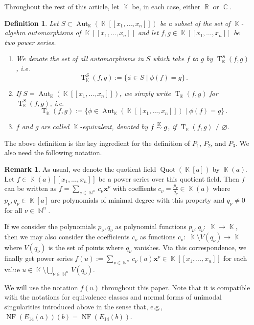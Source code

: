 \documentclass[noend]{amsproc}
\newtheorem{defn}[theorem]{Definition}
\theoremstyle{definition}
\newtheorem{remark}[theorem]{Remark}
\DeclareMathOperator{\N}{\mathbb{N}}
\DeclareMathOperator{\R}{\mathbb{R}}
\DeclareMathOperator{\C}{\mathbb{C}}
\DeclareMathOperator{\K}{\mathbb{K}}
\DeclareMathOperator{\NF}{NF}
\DeclareMathOperator{\T}{T}
\DeclareMathOperator{\Aut}{Aut}
\DeclareMathOperator{\Quot}{Quot}
\newcommand{\ksim}{\ensuremath{\mathrel{%
  \raisebox{0pt}[\heightof{$\overset{\scriptscriptstyle\K}{\sim}$}]{%
    $\overset{\K}{\sim}$%
  }%
}}}
\begin{document}
Throughout the rest of this article, let $\K$ be, in each case, either $\R$ or
$\C$.

\begin{defn}
Let $S \subset \Aut_{\K}(\K[[x_1,\ldots,x_n]])$ be a subset of the set of
$\K$-algebra automorphisms of $\K[[x_1, \ldots, x_n]]$ and let
$f, g \in \K[[x_1, \ldots, x_n]]$ be two power series.
\begin{enumerate}
\item We denote the set of all automorphisms in $S$ which take $f$ to $g$ by
$\T_{\K}^S(f,g)$, i.e.\@
\[
\T_{\K}^S(f,g):=\{\phi\in S\mid \phi(f)=g\}\,.
\]

\item If $S=\Aut_{\K}(\K[[x_1,\ldots,x_n]])$, we simply write
$\T_{\K}(f,g)$ for $\T_{\K}^S(f,g)$, i.e.\@
\[
\T_{\K}(f,g)
:= \{\phi \in \Aut_{\K}(\K[[x_1, \ldots, x_n]]) \mid \phi(f) = g \} \,.
\]

\item $f$ and $g$ are called $\K$-equivalent, denoted by
$f \ksim g$, if $\T_{\K}(f,g) \neq \varnothing$.
\end{enumerate}
\end{defn}

The above definition is the key ingredient for the definition of $P_1$, $P_2$,
and $P_3$. We also need the following notation.

\begin{remark}
As usual, we denote the quotient field
$\Quot(\K[a])$ by $\K(a)$. Let $f \in \K(a)[[x_1,\ldots,x_n]]$ be a power
series over this quotient field. Then $f$ can be written as
$f = \sum_{\nu \in \N^n} c_\nu \boldsymbol{x}^\nu$ with coeffients
$c_\nu = \frac{p_\nu}{q_\nu} \in \K(a)$ where $p_\nu, q_\nu \in \K[a]$ are
polynomials of minimal degree with this property and $q_\nu \neq 0$ for all
$\nu \in \N^n$.

If we consider the polynomials $p_\nu, q_\nu$ as polynomial functions
$p_\nu, q_\nu: \; \K \rightarrow \K$, then we may also consider the
coefficients $c_\nu$ as functions
$c_\nu: \; \K \setminus V(q_\nu) \rightarrow \K$ where $V(q_\nu)$ is the set of
points where $q_\nu$ vanishes. Via this correspondence, we finally get power
series
$f(u) := \sum_{\nu \in \N^n} c_\nu(u) \boldsymbol{x}^\nu
\in \K[[x_1,\ldots,x_n]]$ for each value
$u \in \K \setminus \bigcup_{\nu \in \N^n} V(q_\nu)$.

We will use the notation $f(u)$ throughout this paper. Note that it is
compatible with the notations for equivalence classes and normal forms of
unimodal singularities introduced above in the sense that, e.g.,
$\NF(E_{14}(a))(b) = \NF(E_{14}(b))$.
\end{remark}
\end{document}
